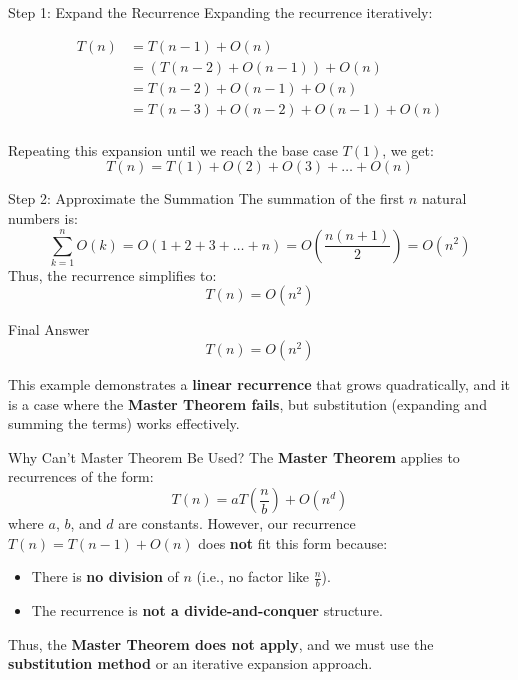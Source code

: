 \documentclass[aspectratio=169]{beamer}
\begin{document}
\begin{frame}{Step 1: Expand the Recurrence}
    Expanding the recurrence iteratively:

    \begin{equation*}
        \begin{align*}
            T(n) &= T(n-1) + O(n) \\
                 &= (T(n-2) + O(n-1)) + O(n) \\
                 &= T(n-2) + O(n-1) + O(n) \\
                 &= T(n-3) + O(n-2) + O(n-1) + O(n) \\
        \end{align*}
    \end{equation*}

    Repeating this expansion until we reach the base case $T(1)$, we get:
    $$
        T(n) = T(1) + O(2) + O(3) + \dots + O(n)
    $$
\end{frame}

\begin{frame}{Step 2: Approximate the Summation}
    The summation of the first $n$ natural numbers is:
    $$
        \sum_{k=1}^{n} O(k) = O(1 + 2 + 3 + \dots + n) = O\left(\frac{n(n + 1)}{2}\right) = O(n^2)
    $$
    Thus, the recurrence simplifies to:
    $$
        T(n) = O(n^2)
    $$
\end{frame}

\begin{frame}{Final Answer}
    $$
        T(n) = O(n^2)
    $$

    This example demonstrates a \textbf{linear recurrence} that grows quadratically, and it is a case where the \textbf{Master Theorem fails}, but substitution (expanding and summing the terms) works effectively.
\end{frame}

\begin{frame}{Why Can't Master Theorem Be Used?}
    The \textbf{Master Theorem} applies to recurrences of the form:
    $$
        T(n) = aT\left(\frac{n}{b}\right) + O(n^d)
    $$
    where $a$, $b$, and $d$ are constants. However, our recurrence $T(n) = T(n-1) + O(n)$ does \textbf{not} fit this form because:

    \begin{itemize}
        \item There is \textbf{no division} of $n$ (i.e., no factor like $\frac{n}{b}$).
        \item The recurrence is \textbf{not a divide-and-conquer} structure.
    \end{itemize}
    Thus, the \textbf{Master Theorem does not apply}, and we must use the \textbf{substitution method} or an iterative expansion approach.
\end{frame}
\end{document}
